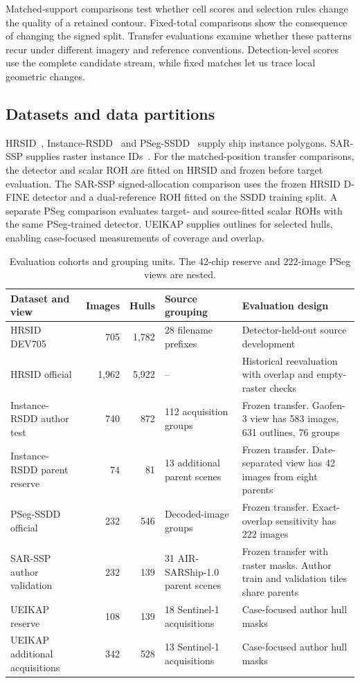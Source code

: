 \documentclass[journal]{IEEEtran}
\begin{document}
Matched-support comparisons test whether cell scores and selection rules change the quality of a retained contour. Fixed-total comparisons show the consequence of changing the signed split. Transfer evaluations examine whether these patterns recur under different imagery and reference conventions. Detection-level scores use the complete candidate stream, while fixed matches let us trace local geometric changes.

\subsection{Datasets and data partitions}

HRSID~\cite{hrsid}, Instance-RSDD~\cite{rsdd} and PSeg-SSDD~\cite{ssdd} supply ship instance polygons. SAR-SSP supplies raster instance IDs~\cite{slgsea}. For the matched-position transfer comparisons, the detector and scalar ROH are fitted on HRSID and frozen before target evaluation. The SAR-SSP signed-allocation comparison uses the frozen HRSID D-FINE detector and a dual-reference ROH fitted on the SSDD training split. A separate PSeg comparison evaluates target- and source-fitted scalar ROHs with the same PSeg-trained detector. UEIKAP supplies outlines for selected hulls, enabling case-focused measurements of coverage and overlap.

\begin{table}[t]
\centering
\caption{Evaluation cohorts and grouping units. The 42-chip reserve and 222-image PSeg views are nested.}
\label{tab:cohorts}
\footnotesize
\renewcommand{\arraystretch}{1.19}
\setlength{\tabcolsep}{5pt}
\begin{tabular}{@{}p{}rrp{}p{}@{}}
\toprule
Dataset and view & Images & Hulls & Source grouping & Evaluation design \\
\midrule
HRSID DEV705 & 705 & 1,782 & 28 filename prefixes & Detector-held-out source development \\
HRSID official & 1,962 & 5,922 & -- & Historical reevaluation with overlap and empty-raster checks \\
\addlinespace[1.5pt]
Instance-RSDD author test & 740 & 872 & 112 acquisition groups & Frozen transfer. Gaofen-3 view has 583 images, 631 outlines, 76 groups \\
Instance-RSDD parent reserve & 74 & 81 & 13 additional parent scenes & Frozen transfer. Date-separated view has 42 images from eight parents \\
PSeg-SSDD official & 232 & 546 & Decoded-image groups & Frozen transfer. Exact-overlap sensitivity has 222 images \\
SAR-SSP author validation & 232 & 139 & 31 AIR-SARShip-1.0 parent scenes & Frozen transfer with raster masks. Author train and validation tiles share parents \\
\addlinespace[1.5pt]
UEIKAP reserve & 108 & 139 & 18 Sentinel-1 acquisitions & Case-focused author hull masks \\
UEIKAP additional acquisitions & 342 & 528 & 13 Sentinel-1 acquisitions & Case-focused author hull masks \\
\bottomrule
\end{tabular}
\end{table}
\end{document}
